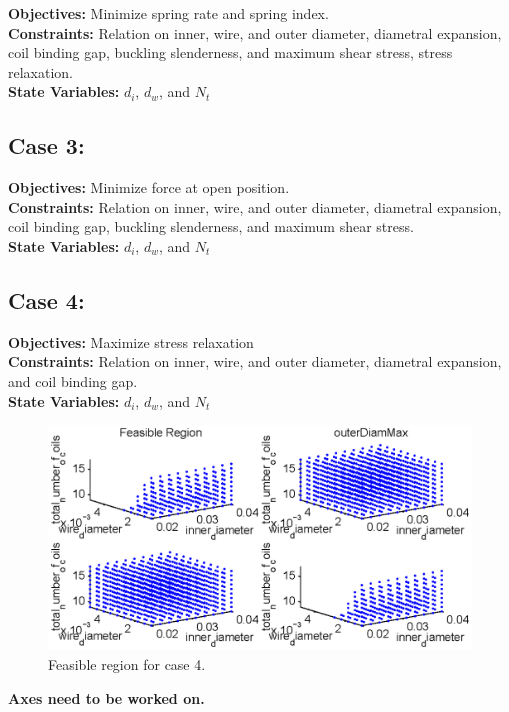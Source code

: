 \documentclass[10pt]{article}
\begin{document}
	\textbf{Objectives:} Minimize spring rate and spring index.\\
	\textbf{Constraints:} Relation on inner, wire, and outer diameter, diametral expansion, coil binding gap, buckling slenderness, and maximum shear stress, stress relaxation. \\
	\textbf{State Variables:} $d_{i}$, $d_{w}$, and $N_{t}$ \\

\newpage
\subsection{Case 3:}
\label{sec:Case3}
	\textbf{Objectives:} Minimize force at open position.\\
	\textbf{Constraints:} Relation on inner, wire, and outer diameter, diametral expansion, coil binding gap, buckling slenderness, and maximum shear stress. \\
	\textbf{State Variables:} $d_{i}$, $d_{w}$, and $N_{t}$ \\

\newpage
\subsection{Case 4:}
\label{sec:Case4} 

	
	\textbf{Objectives:} Maximize stress relaxation\\
	\textbf{Constraints:} Relation on inner, wire, and outer diameter, diametral expansion, and coil binding gap. \\
	\textbf{State Variables:} $d_{i}$, $d_{w}$, and $N_{t}$ \\



		\begin{figure}[h]
		 \begin{center}\includegraphics[scale=.75]{Case_11_348.eps}\end{center}
		 \caption{Feasible region for case 4.}
		 \label{Feasible Case 4}
		 
		 \end{figure}
 		\textbf{Axes need to be worked on.}
\end{document}
